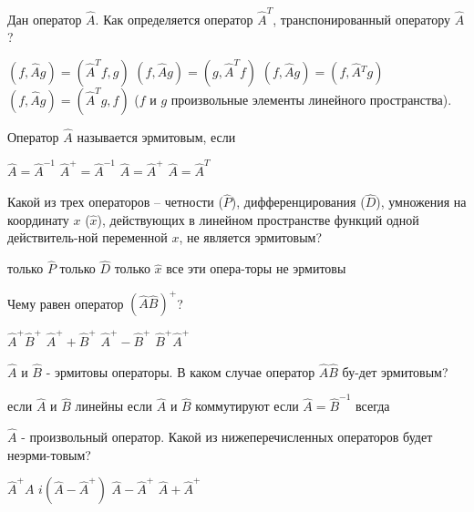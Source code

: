 \documentclass[11pt,a4paper]{exam}
\begin{document}
\begin{questions}
\question Дан оператор $\hat{A}$. Как определяется оператор ${{\hat{A}}^{T}}$, транспонированный оператору $\hat{A}$?
\begin{choices}
\choice $\left( f,\hat{A}g \right)=\left( {{{\hat{A}}}^{T}}f,g \right)$ 
\choice $\left( f,\hat{A}g \right)=\left( g,{{{\hat{A}}}^{T}}f \right)$ 
\choice $\left( f,\hat{A}g \right)=\left( f,\hat{A}{{}^{T}}g \right)$      
\choice $\left( f,\hat{A}g \right)=\left( {{{\hat{A}}}^{T}}g,f \right)$
($f$ и $g$  произвольные элементы линейного пространства).
\end{choices}

\question Оператор $\hat{A}$ называется эрмитовым, если 
\begin{choices}
\choice $\hat{A}={{\hat{A}}^{-1}}$     
\choice ${{\hat{A}}^{+}}={{\hat{A}}^{-1}}$      
\choice $\hat{A}={{\hat{A}}^{+}}$      
\choice $\hat{A}={{\hat{A}}^{T}}$
\end{choices}

\question Какой из трех операторов – четности ($\hat{P}$), дифференцирования ($\hat{D}$), умножения на координату $x$ ($\hat{x}$), действующих в линейном пространстве функций одной действитель-ной переменной $x$, не является эрмитовым?
\begin{choices}
\choice только $\hat{P}$      
\choice только $\hat{D}$      
\choice только $\hat{x}$      
\choice все эти опера-торы не эрмитовы
\end{choices}

\question Чему равен оператор ${{\left( \hat{A}\hat{B} \right)}^{+}}$?
\begin{choices}
\choice ${{\hat{A}}^{+}}{{\hat{B}}^{+}}$     
\choice ${{\hat{A}}^{+}}+{{\hat{B}}^{+}}$    
\choice ${{\hat{A}}^{+}}-{{\hat{B}}^{+}}$    
\choice ${{\hat{B}}^{+}}{{\hat{A}}^{+}}$
\end{choices}

\question $\hat{A}$ и $\hat{B}$ - эрмитовы операторы. В каком случае оператор $\hat{A}\hat{B}$ бу-дет эрмитовым?
\begin{choices}
\choice если $\hat{A}$ и $\hat{B}$ линейны   
\choice если $\hat{A}$ и $\hat{B}$ коммутируют  
\choice если $\hat{A}={{\hat{B}}^{-1}}$   
\choice всегда
\end{choices}

\question $\hat{A}$ - произвольный оператор. Какой из нижеперечисленных операторов будет неэрми-товым?
\begin{choices}
\choice ${{\hat{A}}^{+}}A$    
\choice $i\left( \hat{A}-{{{\hat{A}}}^{+}} \right)$      
\choice $\hat{A}-{{\hat{A}}^{+}}$      
\choice $\hat{A}+{{\hat{A}}^{+}}$
\end{choices}


\end{questions}
\end{document}
